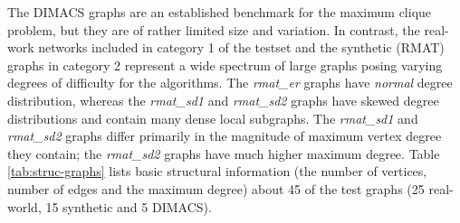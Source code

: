 The DIMACS graphs  are an established benchmark for the maximum
clique problem, but they are of rather limited size and variation. 
In contrast, the real-work networks included  in category 1 of the testset
and the synthetic (RMAT) graphs in category 2
represent a wide spectrum of large graphs posing varying degrees of difficulty for the algorithms. 
The {\it rmat\_er} graphs have {\it normal} degree distribution, whereas the {\it rmat\_sd1} and {\it rmat\_sd2} graphs have skewed degree distributions and contain many dense local subgraphs.
 The {\it rmat\_sd1} and {\it rmat\_sd2} graphs differ primarily in the magnitude of maximum vertex degree they contain; the {\it rmat\_sd2} graphs have much higher maximum degree. 
Table \ref{tab:struc-graphs} lists basic structural information (the number of vertices, 
number of edges and the maximum degree) about 45 of the test graphs (25 real-world, 15 synthetic and 5 DIMACS).



